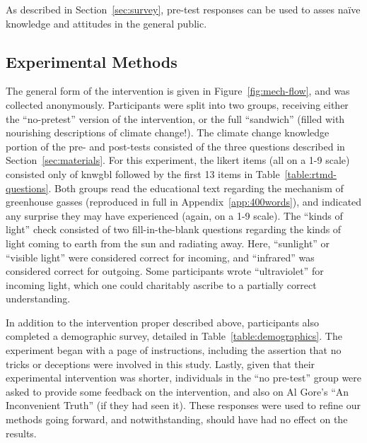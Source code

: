 As described in Section~\ref{sec:survey}, pre-test responses can be used to
asses na\"ive knowledge and attitudes in the general public. 


\subsection{Experimental Methods}

The general form of the intervention is given in Figure~\ref{fig:mech-flow}, and
was collected anonymously.  Participants were split into two groups, receiving
either the “no-pretest” version of the intervention, or the full “sandwich”
(filled with nourishing descriptions of climate change!). The climate change
knowledge portion of the pre- and post-tests consisted of the three questions
described in Section~\ref{sec:materials}. For this experiment, the likert items
(all on a 1-9 scale) consisted only of \textsf{knwgbl} followed by the first 13
items in Table~\ref{table:rtmd-questions}. Both groups read the educational text
regarding the mechanism of greenhouse gasses (reproduced in full in
Appendix~\ref{app:400words}), and indicated any surprise they may have
experienced (again, on a 1-9 scale). The “kinds of light” check consisted of two
fill-in-the-blank questions regarding the kinds of light coming to earth from
the sun and radiating away. Here, “sunlight” or “visible light” were considered
correct for incoming, and “infrared” was considered correct for outgoing.  Some
participants wrote “ultraviolet” for incoming light, which one could charitably
ascribe to a partially correct understanding.

In addition to the intervention proper described above, participants also
completed a demographic survey, detailed in Table~\ref{table:demographics}.
The experiment began with a page of instructions, including the assertion that
no tricks or deceptions were involved in this study. Lastly, given that their
experimental intervention was shorter, individuals in the “no pre-test” group
were asked to provide some feedback on the intervention, and also on Al Gore’s
“An Inconvenient Truth” (if they had seen it). These responses were used to
refine our methods going forward, and \textcite{bem-future} notwithstanding,
should have had no effect on the results.

